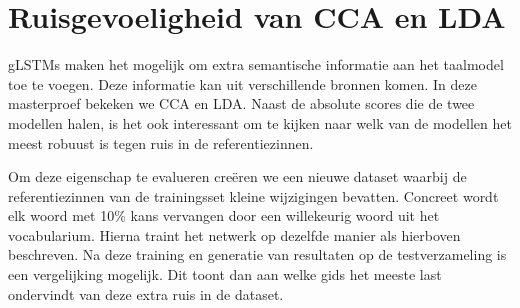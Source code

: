 \section{Ruisgevoeligheid van CCA en LDA} %
\label{sec:ruisgevoeligheid_van_cca_en_lda_exp}
gLSTMs maken het mogelijk om extra semantische informatie aan het taalmodel toe te voegen. Deze informatie kan uit verschillende bronnen komen. In deze masterproef bekeken we CCA en LDA. Naast de absolute scores die de twee modellen halen, is het ook interessant om te kijken naar welk van de modellen het meest robuust is tegen ruis in de referentiezinnen.

Om deze eigenschap te evalueren cre\"eren we een nieuwe dataset waarbij de referentiezinnen van de trainingsset kleine wijzigingen bevatten.
Concreet wordt elk woord met 10\% kans vervangen door een willekeurig woord uit het vocabularium. Hierna traint het netwerk op dezelfde manier als hierboven beschreven. Na deze training en generatie van resultaten op de testverzameling is een vergelijking mogelijk. Dit toont dan aan welke gids het meeste last ondervindt van deze extra ruis in de dataset.


